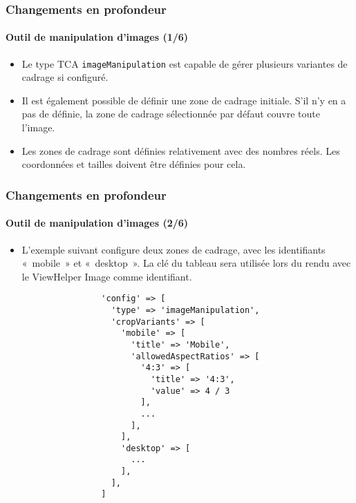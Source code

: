 \begin{frame}[fragile]
	\frametitle{Changements en profondeur}
	\framesubtitle{Outil de manipulation d'images (1/6)}

	\lstset{basicstyle=\tiny\ttfamily}

	\begin{itemize}
		\item Le type TCA \texttt{imageManipulation} est capable de gérer plusieurs variantes
			de cadrage si configuré.

		\item Il est également possible de définir une zone de cadrage initiale. S'il n'y
			en a pas de définie, la zone de cadrage sélectionnée par défaut couvre toute
			l'image.
		\item Les zones de cadrage sont définies relativement avec des nombres réels. Les
			coordonnées et tailles doivent être définies pour cela.

	\end{itemize}

\end{frame}


\begin{frame}[fragile]
	\frametitle{Changements en profondeur}
	\framesubtitle{Outil de manipulation d'images (2/6)}

	\lstset{basicstyle=\tiny\ttfamily}

	\begin{itemize}

		\item L'exemple suivant configure deux zones de cadrage, avec les
			identifiants «~mobile~» et «~desktop~». La clé du tableau sera
			utilisée lors du rendu avec le ViewHelper Image comme identifiant.

			\begin{lstlisting}
				'config' => [
				  'type' => 'imageManipulation',
				  'cropVariants' => [
				    'mobile' => [
				      'title' => 'Mobile',
				      'allowedAspectRatios' => [
				        '4:3' => [
				          'title' => '4:3',
				          'value' => 4 / 3
				        ],
				        ...
				      ],
				    ],
				    'desktop' => [
				      ...
				    ],
				  ],
				]
			\end{lstlisting}

	\end{itemize}

\end{frame}


